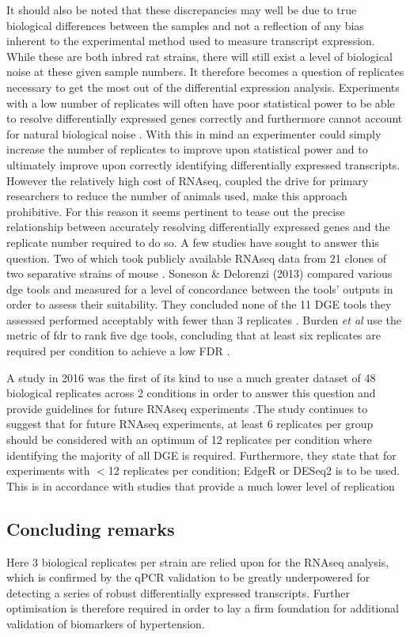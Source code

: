 It should also be noted that these discrepancies may well be due to true biological differences between the samples and not a reflection of any bias inherent to the experimental method used to measure transcript expression. While these are both inbred rat strains, there will still exist a level of biological noise at these given sample numbers. It therefore becomes a question of replicates necessary to get the most out of the differential expression analysis. Experiments with a low number of replicates will often have poor statistical power to be able to resolve differentially expressed genes correctly and furthermore cannot account for natural biological noise \cite{Pan2002, Churchill2002}. With this in mind an experimenter could simply increase the number of replicates to improve upon statistical power and to ultimately improve upon correctly identifying differentially expressed transcripts. However the relatively high cost of RNAseq, coupled the drive for primary researchers to reduce the number of animals used, make this approach prohibitive. For this reason it seems pertinent to tease out the precise relationship between accurately resolving differentially expressed genes and the replicate number required to do so. A few studies have sought to answer this question. Two of which took publicly available RNAseq data from 21 clones of two separative strains of mouse \cite{Bottomly2011,Soneson2013,Burden2014}. Soneson \& Delorenzi (2013) compared various \acrshort{dge} tools and measured for a level of concordance between the tools' outputs in order to assess their suitability. They concluded none of the 11 DGE tools they assessed performed acceptably with fewer than 3 replicates \cite{Soneson2013}. Burden \textit{et al} use the metric of \acrshort{fdr} to rank five \acrshort{dge} tools, concluding that at least six replicates are required per condition to achieve a low FDR \cite{Burden2014}. 

A study in 2016 was the first of its kind to use a much greater dataset of 48 biological replicates across 2 conditions in order to answer this question and provide guidelines for future RNAseq experiments \cite{Schurch2016}.The study continues to suggest that for future RNAseq experiments, at least 6 replicates per group should be considered with an optimum of 12 replicates per condition where identifying the majority of all DGE is required. Furthermore, they state that for experiments with $<$12 replicates per condition; EdgeR or DESeq2 is to be used. This is in accordance with studies that provide a much lower level of replication   

\subsection{Concluding remarks}

Here 3 biological replicates per strain are relied upon for the RNAseq analysis, which is confirmed by the qPCR validation to be greatly underpowered for detecting a series of robust differentially expressed transcripts. Further optimisation is therefore required in order to lay a firm foundation for additional validation of biomarkers of hypertension. 


